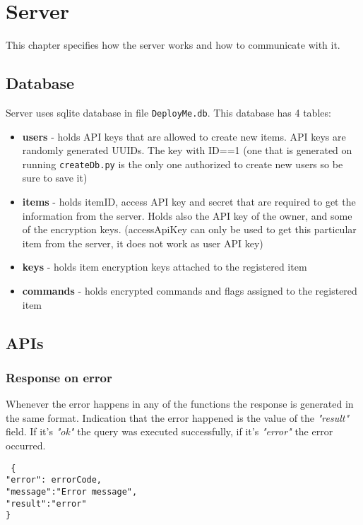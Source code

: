 \chapter{Server}
\label{chapt-Server}
This chapter specifies how the server works and how to communicate with it.

\section{Database}
Server uses sqlite database in file \texttt{DeployMe.db}. This database has 4 tables:
\begin{itemize}
  \item \textbf{users} - holds API keys that are allowed to create new items. API keys are randomly generated UUIDs. The key with ID==1 (one that is generated on running \texttt{createDb.py} is the only one authorized to create new users so be sure to save it)
  \item \textbf{items} - holds itemID, access API key and secret that are required to get the information from the server. Holds also the API key of the owner, and some of the encryption keys. (accessApiKey can only be used to get this particular item from the server, it does not work as user API key)
  \item \textbf{keys} - holds item encryption keys attached to the registered item
  \item \textbf{commands} - holds encrypted commands and flags assigned to the registered item
\end{itemize}

\section{APIs}

\subsection{Response on error}
Whenever the error happens in any of the functions the response is generated in the same format. Indication that the error happened is the value of the \emph{"result"} field. If it's \emph{"ok"} the query was executed successfully, if it's \emph{"error"} the error occurred.

\texttt{
  \{ \\
  "error": errorCode,\\
  "message":"Error message",\\
  "result":"error"\\
  \}
}

